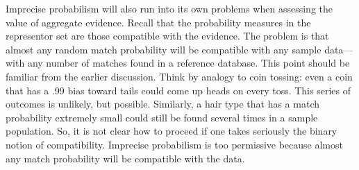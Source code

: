 \documentclass[
  letterpaper,
  DIV=11,
  numbers=noendperiod]{scrartcl}
\begin{document}
Imprecise probabilism will also run into its own problems when assessing
the value of aggregate evidence. Recall that the probability measures in
the representor set are those compatible with the evidence. The problem
is that almost any random match probability will be compatible with any
sample data---with any number of matches found in a reference database.
This point should be familiar from the earlier discussion. Think by
analogy to coin tossing: even a coin that has a .99 bias toward tails
could come up heads on every toss. This series of outcomes is unlikely,
but possible. Similarly, a hair type that has a match probability
extremely small could still be found several times in a sample
population. So, it is not clear how to proceed if one takes seriously
the binary notion of compatibility. Imprecise probabilism is too
permissive because almost any match probability will be compatible with
the data.
\end{document}
